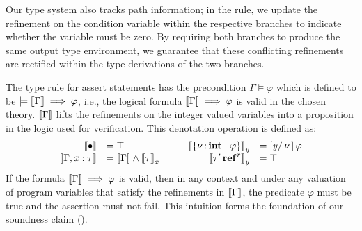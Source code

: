 

Our type system also tracks path information; in the 
rule, we update the refinement on the condition variable within the respective
branches to indicate whether the variable must be zero. By requiring
both branches to produce the same output type environment, we guarantee
that these conflicting refinements are rectified within the
type derivations of the two branches.

The type rule for assert statements has the precondition
$\Gamma  \models  \varphi$ which is defined to be $\models   \left\llbracket{ \Gamma }\right\rrbracket   \implies  \varphi$, i.e.,
the logical formula $ \left\llbracket{ \Gamma }\right\rrbracket   \implies  \varphi$ is valid in the chosen theory.
$ \left\llbracket{ \Gamma }\right\rrbracket $ lifts the refinements on the integer valued variables into a proposition
in the logic used for verification. This denotation
operation is defined as:
\[
\begin{array}{rlcrl}
   \left\llbracket{  \bullet  }\right\rrbracket  &=  \top  & \hspace{1em} &   \left\llbracket{  \left\{{  \nu  \operatorname{:}\mathbf{int}\mid  \varphi }\right\}  }\right\rrbracket_{ \mathit{y} }  & = [  \mathit{y}  / \, \nu \, ] \, \varphi \\
   \left\llbracket{ \Gamma  ,  \mathit{x}  :  \tau }\right\rrbracket  &=  \left\llbracket{ \Gamma }\right\rrbracket   \wedge   \left\llbracket{ \tau }\right\rrbracket_{ \mathit{x} }  &   &   \left\llbracket{  \tau'  \operatorname{\mathbf{ref}}^{ r }  }\right\rrbracket_{ \mathit{y} }  & =  \top  \\
\end{array}
\]
If the formula $ \left\llbracket{ \Gamma }\right\rrbracket   \implies  \varphi$
is valid, then in any context and under any valuation of program variables that satisfy
the refinements in $ \left\llbracket{ \Gamma }\right\rrbracket $,
the predicate $\varphi$ must be true and the
assertion must not fail. This intuition forms the foundation of our
soundness claim ().

